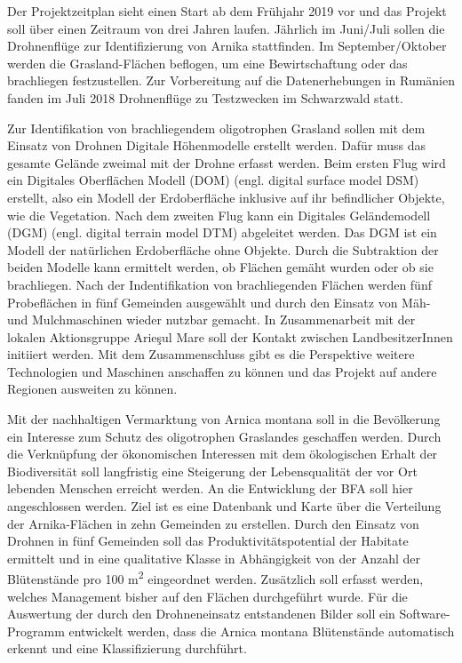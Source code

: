 Der Projektzeitplan sieht einen Start ab dem Frühjahr 2019 vor und das Projekt soll über einen Zeitraum von drei Jahren laufen. Jährlich im Juni/Juli sollen die Drohnenflüge zur Identifizierung von Arnika stattfinden. Im September/Oktober werden die Grasland-Flächen beflogen, um eine Bewirtschaftung oder das brachliegen festzustellen. Zur Vorbereitung auf die Datenerhebungen in Rumänien fanden im Juli 2018 Drohnenflüge zu Testzwecken im Schwarzwald statt.

Zur Identifikation von brachliegendem oligotrophen Grasland sollen mit dem Einsatz von Drohnen Digitale Höhenmodelle erstellt werden. Dafür muss das gesamte Gelände zweimal mit der Drohne erfasst werden. Beim ersten Flug wird ein Digitales Oberflächen Modell (DOM) (engl. digital surface model DSM) erstellt, also ein Modell der Erdoberfläche inklusive auf ihr befindlicher Objekte, wie die Vegetation. Nach dem zweiten Flug kann ein Digitales Geländemodell (DGM) (engl. digital terrain model DTM) abgeleitet werden. Das DGM ist ein Modell der natürlichen Erdoberfläche ohne Objekte. Durch die Subtraktion der beiden Modelle kann ermittelt werden, ob Flächen gemäht wurden oder ob sie brachliegen. Nach der Indentifikation von brachliegenden Flächen werden fünf Probeflächen in fünf Gemeinden ausgewählt und durch den Einsatz von Mäh- und Mulchmaschinen wieder nutzbar gemacht. In Zusammenarbeit mit der lokalen Aktionsgruppe Arieşul Mare soll der Kontakt zwischen LandbesitzerInnen initiiert werden. Mit dem Zusammenschluss gibt es die Perspektive weitere Technologien und Maschinen anschaffen zu können und das Projekt auf andere Regionen ausweiten zu können.

Mit der nachhaltigen Vermarktung von Arnica montana soll in die Bevölkerung ein Interesse zum Schutz des oligotrophen Graslandes geschaffen werden. Durch die Verknüpfung der ökonomischen Interessen mit dem ökologischen Erhalt der Biodiversität soll langfristig eine Steigerung der Lebensqualität der vor Ort lebenden Menschen erreicht werden. An die Entwicklung der BFA soll hier angeschlossen werden. Ziel ist es eine Datenbank und Karte über die Verteilung der Arnika-Flächen in zehn Gemeinden zu erstellen. Durch den Einsatz von Drohnen in fünf Gemeinden soll das Produktivitätspotential der Habitate ermittelt und in eine qualitative Klasse in Abhängigkeit von der Anzahl der Blütenstände pro 100 m\textsuperscript{2} eingeordnet werden. Zusätzlich soll erfasst werden, welches Management bisher auf den Flächen durchgeführt wurde. Für die Auswertung der durch den Drohneneinsatz entstandenen Bilder soll ein Software-Programm entwickelt werden, dass die Arnica montana Blütenstände automatisch erkennt und eine Klassifizierung durchführt.


